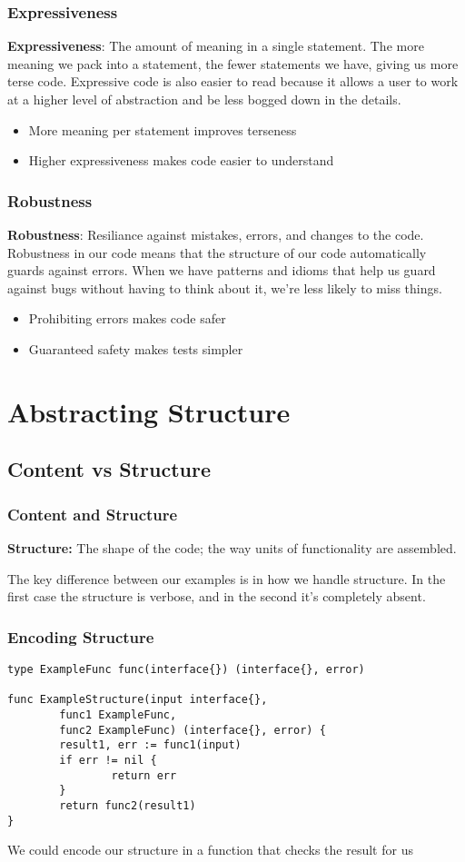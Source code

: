 \documentclass{beamer}
\begin{document}
\begin{frame}
  \frametitle{Expressiveness}
  {\bf Expressiveness}: The amount of meaning in a single statement.
  \vfill
  The more meaning we pack into a statement, the fewer statements we
  have, giving us more terse code.  Expressive code is also easier to
  read because it allows a user to work at a higher level of
  abstraction and be less bogged down in the details.
  \vfill
  \begin{itemize}
  \item More meaning per statement improves terseness
  \item Higher expressiveness makes code easier to understand
  \end{itemize}
\end{frame}

\begin{frame}
  \frametitle{Robustness}
  {\bf Robustness}: Resiliance against mistakes, errors, and changes to the code.
  \vfill
  Robustness in our code means that the structure of our code
  automatically guards against errors.  When we have patterns and
  idioms that help us guard against bugs without having to think about
  it, we're less likely to miss things.
  \vfill
  \begin{itemize}
  \item Prohibiting errors makes code safer
  \item Guaranteed safety makes tests simpler
  \end{itemize}
\end{frame}
\section{Abstracting Structure}
\subsection{Content vs Structure}

\begin{frame}
  \frametitle{Content and Structure}
  {\bf Structure:} The shape of the code; the way units of functionality are assembled.

  \vfill

  The key difference between our examples is in how we handle
  structure.  In the first case the structure is verbose, and in the
  second it's completely absent.

  \vfill
\end{frame}

\begin{frame}[fragile]
  \frametitle{Encoding Structure}
\begin{lstlisting}
type ExampleFunc func(interface{}) (interface{}, error)

func ExampleStructure(input interface{},
        func1 ExampleFunc,
        func2 ExampleFunc) (interface{}, error) {
        result1, err := func1(input)
        if err != nil {
                return err
        }
        return func2(result1)
}
\end{lstlisting}
  \vfill
  We could encode our structure in a function that checks the result for us
\end{frame}
\end{document}
